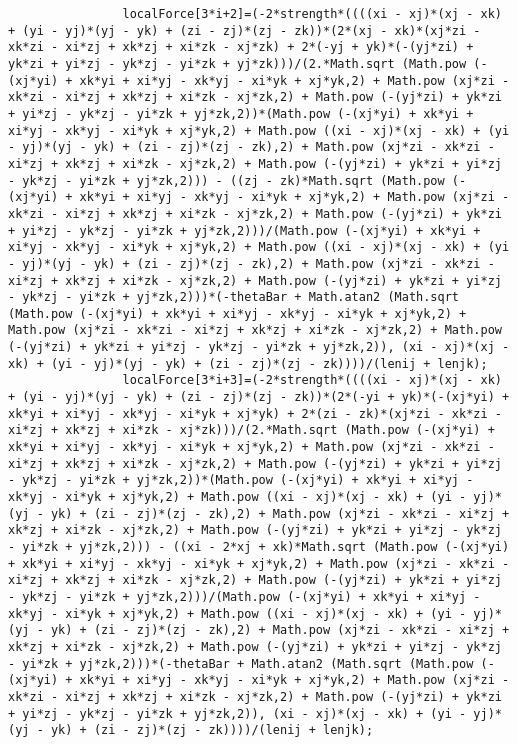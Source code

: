 \begin{lstlisting}
				localForce[3*i+2]=(-2*strength*((((xi - xj)*(xj - xk) + (yi - yj)*(yj - yk) + (zi - zj)*(zj - zk))*(2*(xj - xk)*(xj*zi - xk*zi - xi*zj + xk*zj + xi*zk - xj*zk) + 2*(-yj + yk)*(-(yj*zi) + yk*zi + yi*zj - yk*zj - yi*zk + yj*zk)))/(2.*Math.sqrt (Math.pow (-(xj*yi) + xk*yi + xi*yj - xk*yj - xi*yk + xj*yk,2) + Math.pow (xj*zi - xk*zi - xi*zj + xk*zj + xi*zk - xj*zk,2) + Math.pow (-(yj*zi) + yk*zi + yi*zj - yk*zj - yi*zk + yj*zk,2))*(Math.pow (-(xj*yi) + xk*yi + xi*yj - xk*yj - xi*yk + xj*yk,2) + Math.pow ((xi - xj)*(xj - xk) + (yi - yj)*(yj - yk) + (zi - zj)*(zj - zk),2) + Math.pow (xj*zi - xk*zi - xi*zj + xk*zj + xi*zk - xj*zk,2) + Math.pow (-(yj*zi) + yk*zi + yi*zj - yk*zj - yi*zk + yj*zk,2))) - ((zj - zk)*Math.sqrt (Math.pow (-(xj*yi) + xk*yi + xi*yj - xk*yj - xi*yk + xj*yk,2) + Math.pow (xj*zi - xk*zi - xi*zj + xk*zj + xi*zk - xj*zk,2) + Math.pow (-(yj*zi) + yk*zi + yi*zj - yk*zj - yi*zk + yj*zk,2)))/(Math.pow (-(xj*yi) + xk*yi + xi*yj - xk*yj - xi*yk + xj*yk,2) + Math.pow ((xi - xj)*(xj - xk) + (yi - yj)*(yj - yk) + (zi - zj)*(zj - zk),2) + Math.pow (xj*zi - xk*zi - xi*zj + xk*zj + xi*zk - xj*zk,2) + Math.pow (-(yj*zi) + yk*zi + yi*zj - yk*zj - yi*zk + yj*zk,2)))*(-thetaBar + Math.atan2 (Math.sqrt (Math.pow (-(xj*yi) + xk*yi + xi*yj - xk*yj - xi*yk + xj*yk,2) + Math.pow (xj*zi - xk*zi - xi*zj + xk*zj + xi*zk - xj*zk,2) + Math.pow (-(yj*zi) + yk*zi + yi*zj - yk*zj - yi*zk + yj*zk,2)), (xi - xj)*(xj - xk) + (yi - yj)*(yj - yk) + (zi - zj)*(zj - zk))))/(lenij + lenjk);
				localForce[3*i+3]=(-2*strength*((((xi - xj)*(xj - xk) + (yi - yj)*(yj - yk) + (zi - zj)*(zj - zk))*(2*(-yi + yk)*(-(xj*yi) + xk*yi + xi*yj - xk*yj - xi*yk + xj*yk) + 2*(zi - zk)*(xj*zi - xk*zi - xi*zj + xk*zj + xi*zk - xj*zk)))/(2.*Math.sqrt (Math.pow (-(xj*yi) + xk*yi + xi*yj - xk*yj - xi*yk + xj*yk,2) + Math.pow (xj*zi - xk*zi - xi*zj + xk*zj + xi*zk - xj*zk,2) + Math.pow (-(yj*zi) + yk*zi + yi*zj - yk*zj - yi*zk + yj*zk,2))*(Math.pow (-(xj*yi) + xk*yi + xi*yj - xk*yj - xi*yk + xj*yk,2) + Math.pow ((xi - xj)*(xj - xk) + (yi - yj)*(yj - yk) + (zi - zj)*(zj - zk),2) + Math.pow (xj*zi - xk*zi - xi*zj + xk*zj + xi*zk - xj*zk,2) + Math.pow (-(yj*zi) + yk*zi + yi*zj - yk*zj - yi*zk + yj*zk,2))) - ((xi - 2*xj + xk)*Math.sqrt (Math.pow (-(xj*yi) + xk*yi + xi*yj - xk*yj - xi*yk + xj*yk,2) + Math.pow (xj*zi - xk*zi - xi*zj + xk*zj + xi*zk - xj*zk,2) + Math.pow (-(yj*zi) + yk*zi + yi*zj - yk*zj - yi*zk + yj*zk,2)))/(Math.pow (-(xj*yi) + xk*yi + xi*yj - xk*yj - xi*yk + xj*yk,2) + Math.pow ((xi - xj)*(xj - xk) + (yi - yj)*(yj - yk) + (zi - zj)*(zj - zk),2) + Math.pow (xj*zi - xk*zi - xi*zj + xk*zj + xi*zk - xj*zk,2) + Math.pow (-(yj*zi) + yk*zi + yi*zj - yk*zj - yi*zk + yj*zk,2)))*(-thetaBar + Math.atan2 (Math.sqrt (Math.pow (-(xj*yi) + xk*yi + xi*yj - xk*yj - xi*yk + xj*yk,2) + Math.pow (xj*zi - xk*zi - xi*zj + xk*zj + xi*zk - xj*zk,2) + Math.pow (-(yj*zi) + yk*zi + yi*zj - yk*zj - yi*zk + yj*zk,2)), (xi - xj)*(xj - xk) + (yi - yj)*(yj - yk) + (zi - zj)*(zj - zk))))/(lenij + lenjk);

\end{lstlisting}
